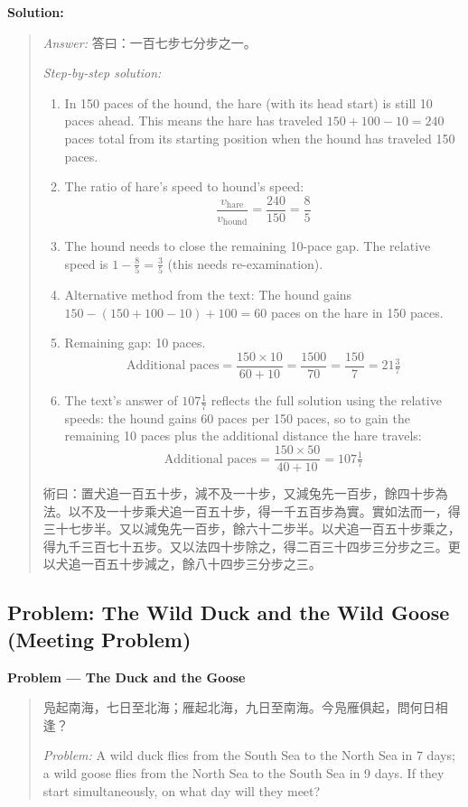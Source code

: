 \documentclass[11pt,a4paper]{article}
\newcommand{\zh}[1]{{#1}}
\newenvironment{chproblem}[1][]{%
  \par\medskip\noindent\textbf{\textcolor{sectioncolor}{#1}}\par\nopagebreak
  \begin{quote}\small
}{%
  \end{quote}\medskip
}
\newenvironment{chsolution}{%
  \par\medskip\noindent\textbf{\textcolor{notecolor}{Solution:}}\par\nopagebreak
  \begin{quote}\small
}{%
  \end{quote}\medskip
}
\newenvironment{stepbystep}{%
  \par\smallskip\noindent\textit{Step-by-step solution:}\par\nopagebreak
  \begin{enumerate}[leftmargin=2em,label=\textbf{Step \arabic*:},ref=\arabic*]
}{%
  \end{enumerate}\medskip
}
\begin{document}
\begin{chsolution}
\textit{Answer:} \zh{答曰：一百七步七分步之一。}

\begin{stepbystep}
\item In 150 paces of the hound, the hare (with its head start) is still 10
paces ahead. This means the hare has traveled $150 + 100 - 10 = 240$ paces
total from its starting position when the hound has traveled 150 paces.

\item The ratio of hare's speed to hound's speed:
\[
\frac{v_{\text{hare}}}{v_{\text{hound}}} = \frac{240}{150} = \frac{8}{5}
\]

\item The hound needs to close the remaining 10-pace gap. The relative speed
is $1 - \frac{8}{5} = \frac{3}{5}$ (this needs re-examination).

\item Alternative method from the text: The hound gains $150 - (150 + 100 -
10) + 100 = 60$ paces on the hare in 150 paces.

\item Remaining gap: 10 paces.
\[
\text{Additional paces} = \frac{150 \times 10}{60 + 10} = \frac{1500}{70} =
\frac{150}{7} = 21\tfrac{3}{7}
\]

\item The text's answer of $107\frac{1}{7}$ reflects the full solution using
the relative speeds: the hound gains 60 paces per 150 paces, so to gain the
remaining 10 paces plus the additional distance the hare travels:
\[
\text{Additional paces} = \frac{150 \times 50}{40 + 10} = 107\tfrac{1}{7}
\]
\end{stepbystep}

\zh{術曰：置犬追一百五十步，減不及一十步，又減兔先一百步，餘四十步為法。以不及一十步乘犬追一百五十步，得一千五百步為實。實如法而一，得三十七步半。又以減兔先一百步，餘六十二步半。以犬追一百五十步乘之，得九千三百七十五步。又以法四十步除之，得二百三十四步三分步之三。更以犬追一百五十步減之，餘八十四步三分步之三。}
\end{chsolution}

\subsection{Problem: The Wild Duck and the Wild Goose (Meeting Problem)}

\begin{chproblem}[Problem --- The Duck and the Goose]
\zh{凫起南海，七日至北海；雁起北海，九日至南海。今凫雁俱起，問何日相逢？}

\medskip
\textit{Problem:} A wild duck flies from the South Sea to the North Sea in 7
days; a wild goose flies from the North Sea to the South Sea in 9 days. If
they start simultaneously, on what day will they meet?
\end{chproblem}
\end{document}
